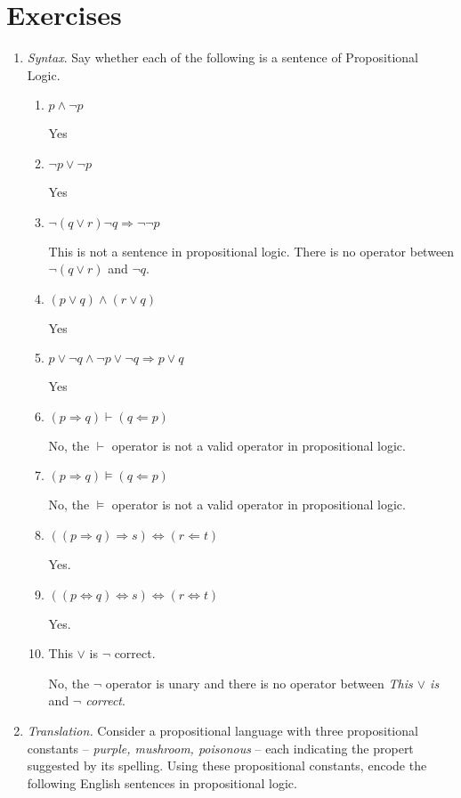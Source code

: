 \documentclass{article}
\begin{document}
\section*{Exercises}

\begin{enumerate}
	\item \emph{Syntax}. Say whether each of the following is a sentence of Propositional Logic.
	\begin{enumerate}
		\item $p \wedge \neg p$

			Yes
		\item $\neg p \vee \neg p$

			Yes

		\item $\neg (q \vee r) \neg q \Rightarrow \neg\neg p$

			This is not a sentence in propositional logic. There is no operator between $\neg(q \vee r)$ and $\neg q$.

		\item $(p \vee q) \wedge (r \vee q)$

			Yes

		\item $p \vee \neg q \wedge \neg p \vee \neg q \Rightarrow p \vee q$

			Yes

		\item $( p \Rightarrow q) \vdash (q \Leftarrow p)$

			No, the $\vdash$ operator is not a valid operator in propositional logic.

		\item $(p \Rightarrow q) \models (q \Leftarrow p)$

			No, the $\models$ operator is not a valid operator in propositional logic.

		\item $((p \Rightarrow q) \Rightarrow s) \Leftrightarrow (r \Leftarrow t)$

			Yes.

		\item $((p \Leftrightarrow q) \Leftrightarrow s) \Leftrightarrow ( r \Leftrightarrow t)$

			Yes.

		\item This $\vee$ is $\neg$ correct.

			No, the $\neg$ operator is unary and there is no operator between \emph{This $\vee$ is} and \emph{$\neg$ correct}.
	\end{enumerate}
	\item \emph{Translation.} Consider a propositional language with three propositional constants -- \emph{purple, mushroom, poisonous} --
		each indicating the propert suggested by its spelling. Using these propositional constants, encode the following English sentences
		in propositional logic.



\end{enumerate}
\end{document}
